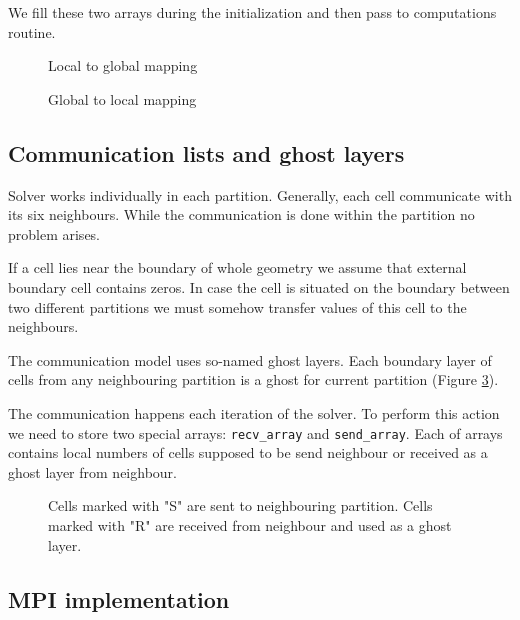 \documentclass[12pt, a4paper]{article}
\begin{document}
We fill these two arrays during the initialization and then pass to 
computations routine. 

\begin{figure}[ht]
	\caption{Local to global mapping}
	\label{fig:LocalGlobal}
\end{figure}

\begin{figure}[ht]
	\caption{Global to local mapping}
	\label{fig:GlobalLocal}
\end{figure}


\subsection{Communication lists and ghost layers}

Solver works individually in each partition. Generally,
each cell communicate with its six neighbours.
While the communication is done within the partition no
problem arises. 

If a cell lies near the boundary of 
whole geometry we assume that external boundary cell contains zeros.
In case the cell is situated on the boundary between
two different partitions we must somehow transfer values of this cell
to the neighbours.

The communication model uses so-named ghost layers.
Each boundary layer of cells from any neighbouring partition is a ghost 
for current partition (Figure \ref{fig:Ghost}).

The communication happens each iteration of the solver.
To perform this action we need to store two special arrays:
\texttt{recv\_array} and \texttt{send\_array}.
Each of arrays contains local numbers of cells supposed 
to be send neighbour or received as a ghost layer from neighbour.

\begin{figure}[ht]
	\caption{Cells marked with "S" are sent to neighbouring partition. Cells marked with "R" are 
	received from neighbour and used as a ghost layer.}
	\label{fig:Ghost}
\end{figure}



\subsection{MPI implementation}
\end{document}
